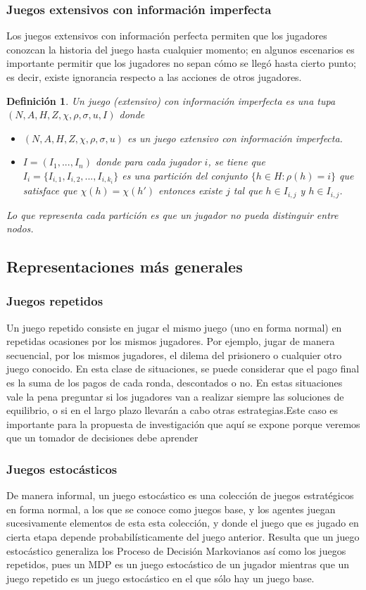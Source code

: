 \documentclass[11pt]{article}
\theoremstyle{plain}
\newtheorem{defi}[teo]{Definición}
\begin{document}
\subsubsection{Juegos extensivos con información imperfecta}
Los juegos extensivos con información perfecta permiten que los jugadores conozcan la historia del juego hasta cualquier momento; en algunos escenarios es importante permitir que los jugadores no sepan cómo se llegó hasta cierto punto; es decir, existe ignorancia respecto a las acciones de otros jugadores.
\begin{defi}
Un juego (extensivo) con información imperfecta es una tupa $(N,A,H,Z,\chi,\rho,\sigma, u, I)$ donde
\begin{itemize}
\item $(N,A,H,Z,\chi,\rho,\sigma, u)$ es un juego extensivo con información imperfecta.
\item $I=(I_1,...,I_n)$ donde para cada jugador $i$, se tiene que $I_i = \{ I_{i,1}, I_{i,2}, ... , I_{i,k_i} \}$ es una partición del conjunto $\{ h \in H: \rho(h)=i \}$ que satisface que $\chi(h)=\chi(h')$ entonces existe $j$ tal que $h \in I_{i,j}$ y $h \in I_{i,j}$.
\end{itemize}
Lo que representa cada partición es que un jugador no pueda distinguir entre nodos.
\end{defi}
\subsection{Representaciones más generales}
\subsubsection{Juegos repetidos}
Un juego repetido consiste en jugar el mismo juego (uno en forma normal) en repetidas ocasiones por los mismos jugadores. Por ejemplo, jugar de manera secuencial, por los mismos jugadores, el dilema del prisionero o cualquier otro juego conocido. En esta clase de situaciones, se puede considerar que el pago final es la suma de los pagos de cada ronda, descontados o no. En estas situaciones vale la pena preguntar si los jugadores van a realizar siempre las soluciones de equilibrio, o si en el largo plazo llevarán a cabo otras estrategias.Este caso es importante para la propuesta de investigación que aquí se expone porque veremos que un tomador de decisiones debe aprender
\subsubsection{Juegos estocásticos}
De manera informal, un juego estocástico es una colección de juegos estratégicos en forma normal, a los que se conoce como juegos base, y los agentes juegan sucesivamente elementos de esta esta colección, y donde el juego que es jugado en cierta etapa depende probabilísticamente del juego anterior. Resulta que un juego estocástico generaliza los Proceso de Decisión Markovianos así como los juegos repetidos, pues un MDP es un juego estocástico de un jugador mientras que un juego repetido es un juego estocástico en el que sólo hay un juego base.
\end{document}
